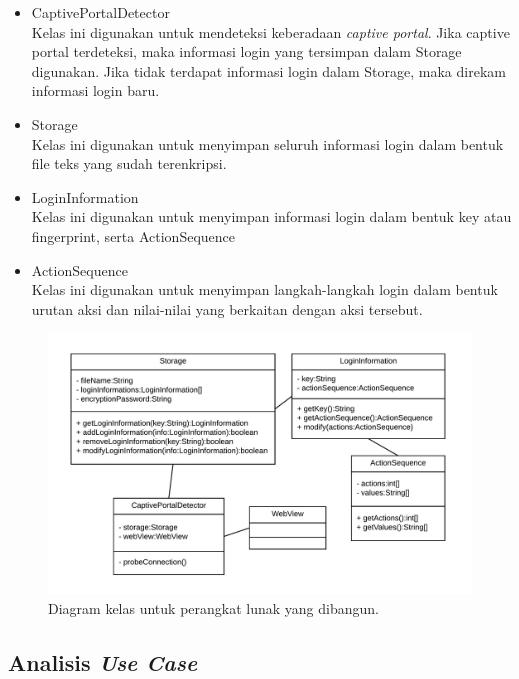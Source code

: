 \begin{itemize}
    \item{CaptivePortalDetector\\Kelas ini digunakan untuk mendeteksi keberadaan \textit{captive portal}. Jika captive portal terdeteksi, maka informasi login yang tersimpan dalam Storage digunakan. Jika tidak terdapat informasi login dalam Storage, maka direkam informasi login baru.}
    \item{Storage\\Kelas ini digunakan untuk menyimpan seluruh informasi login dalam bentuk file teks yang sudah terenkripsi.}
    \item{LoginInformation\\Kelas ini digunakan untuk menyimpan informasi login dalam bentuk key atau fingerprint, serta ActionSequence}
    \item{ActionSequence\\Kelas ini digunakan untuk menyimpan langkah-langkah login dalam bentuk urutan aksi dan nilai-nilai yang berkaitan dengan aksi tersebut.}
\end{itemize}

\begin{figure}[h]
    \centering
    \includegraphics[scale=0.85]{Gambar/classdiagram.png}
    \caption[Diagram kelas untuk perangkat lunak yang dibangun.]{Diagram kelas untuk perangkat lunak yang dibangun.}
    \label{fig:diagramkelas}
\end{figure}

\subsection{Analisis \textit{Use Case}}
\label{sec:analisis_use_case}

